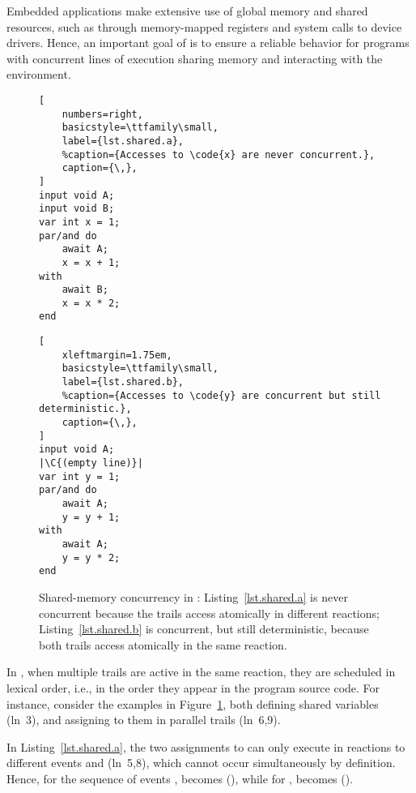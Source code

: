 Embedded applications make extensive use of global memory and shared resources,
such as through memory-mapped registers and system calls to device drivers.
Hence, an important goal of \CEU is to ensure a reliable behavior for programs
with concurrent lines of execution sharing memory and interacting with the
environment.

\begingroup
\begin{figure}[b!]
\begin{minipage}[t]{0.45\linewidth}
\begin{lstlisting}[
    numbers=right,
    basicstyle=\ttfamily\small,
    label={lst.shared.a},
    %caption={Accesses to \code{x} are never concurrent.},
    caption={\,},
]
input void A;
input void B;
var int x = 1;
par/and do
    await A;
    x = x + 1;
with
    await B;
    x = x * 2;
end
\end{lstlisting}
\end{minipage}%
%
\begin{minipage}[t]{0.53\linewidth}
\begin{lstlisting}[
    xleftmargin=1.75em,
    basicstyle=\ttfamily\small,
    label={lst.shared.b},
    %caption={Accesses to \code{y} are concurrent but still deterministic.},
    caption={\,},
]
input void A;
|\C{(empty line)}|
var int y = 1;
par/and do
    await A;
    y = y + 1;
with
    await A;
    y = y * 2;
end

\end{lstlisting}
\end{minipage}%
\caption{Shared-memory concurrency in \CEU:
Listing~\ref{lst.shared.a} is never concurrent because the trails access
 atomically in different reactions;
Listing~\ref{lst.shared.b} is concurrent, but still deterministic, because both
trails access  atomically in the same reaction.}
\label{lst.shared}
\end{figure}
\endgroup

In \CEU, when multiple trails are active in the same reaction, they are
scheduled in lexical order, i.e., in the order they appear in the program
source code.
%
For instance, consider the examples in Figure~\ref{lst.shared}, both
defining shared variables (ln~3), and assigning to them in parallel trails
(ln~6,9).

In Listing~\ref{lst.shared.a}, the two assignments to  can only execute
in reactions to different events  and  (ln~5,8), which cannot
occur simultaneously by definition.
Hence, for the sequence of events ,  becomes 
(), while for ,  becomes 
().

